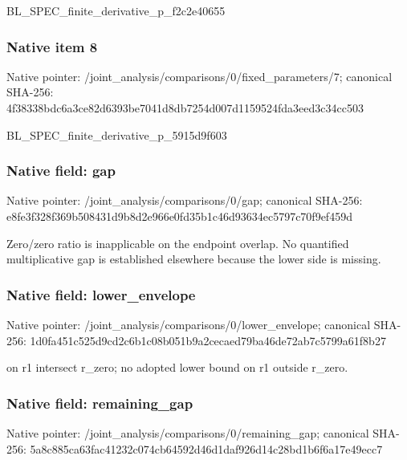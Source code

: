 \documentclass[10pt,a4paper]{article}
\begin{document}
\begingroup\raggedright\sloppy BL\_\allowbreak{}SPEC\_\allowbreak{}finite\_\allowbreak{}derivative\_\allowbreak{}p\_\allowbreak{}f2c2e40655\par\endgroup

\subsubsection{Native item 8}
Native pointer: /joint\_\allowbreak{}analysis/comparisons/0/fixed\_\allowbreak{}parameters/7; canonical SHA-256: 4f38338bdc6a3ce82d6393be7041d8db7254d007d1159524fda3eed3c34cc503

\begingroup\raggedright\sloppy BL\_\allowbreak{}SPEC\_\allowbreak{}finite\_\allowbreak{}derivative\_\allowbreak{}p\_\allowbreak{}5915d9f603\par\endgroup

\subsubsection{Native field: gap}
Native pointer: /joint\_\allowbreak{}analysis/comparisons/0/gap; canonical SHA-256: e8fe3f328f369b508431d9b8d2e966e0fd35b1c46d93634ec5797c70f9ef459d

\begingroup\raggedright\sloppy Zero/\allowbreak{}zero ratio is inapplicable on the endpoint overlap. No quantified multiplicative gap is established elsewhere because the lower side is missing.\par\endgroup

\subsubsection{Native field: lower\_\allowbreak{}envelope}
Native pointer: /joint\_\allowbreak{}analysis/comparisons/0/lower\_\allowbreak{}envelope; canonical SHA-256: 1d0fa451c525d9cd2c6b1c08b051b9a2cecaed79ba46de72ab7c5799a61f8b27

\begingroup\raggedright{} on r1 intersect r\_\allowbreak{}zero;\allowbreak{} no adopted lower bound on r1 outside r\_\allowbreak{}zero.\par\endgroup

\subsubsection{Native field: remaining\_\allowbreak{}gap}
Native pointer: /joint\_\allowbreak{}analysis/comparisons/0/remaining\_\allowbreak{}gap; canonical SHA-256: 5a8c885ca63fac41232c074cb64592d46d1daf926d14c28bd1b6f6a17e49ecc7
\end{document}
